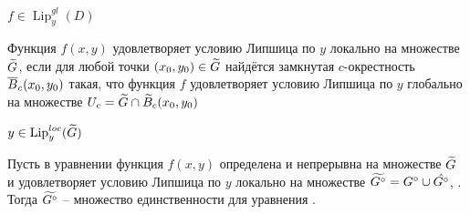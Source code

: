 \begin{notation}
    $ f \in \operatorname{Lip}_y^{gl}(D) $
\end{notation}

\begin{definition}
    Функция $ f(x, y) $ удовлетворяет условию Липшица по $ y $ локально на множестве $ \widetilde{G} $, если для любой точки $ (x_0, y_0) \in \widetilde{G} $ найдётся замкнутая $ c $-окрестность $ \overline{B}_c(x_0, y_0) $ такая, что функция $ f $ удовлетворяет условию Липшица по $ y $ глобально на множестве $ U_c = \widetilde{G} \cap \widetilde{B}_c(x_0, y_0) $
\end{definition}

\begin{notation}
    $ y \in \operatorname{Lip}_y^{loc}(\widetilde{G}) $
\end{notation}

\begin{theorem}
    Пусть в уравнении  функция $ f(x, y) $ определена и непрерывна на множестве $ \widetilde{G} $ и удовлетворяет условию Липшица по $ y $ локально на множестве $ \widetilde{G^\circ} = G^\circ \cup \hat{G^\circ} $, . \\
    Тогда $ \widetilde{G^\circ} $ -- множество единственности для уравнения .
\end{theorem}

